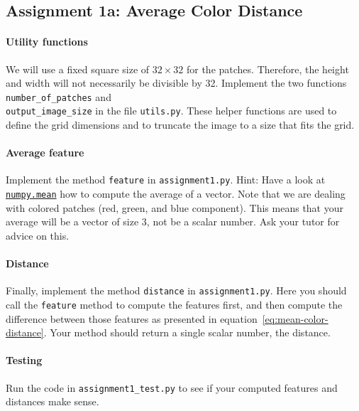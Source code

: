 \documentclass[]{article}
\begin{document}
	\subsection{Assignment 1a: Average Color Distance}
		\paragraph{Utility functions} 
		We will use a fixed square size of $32 \times 32$ for the patches.
		Therefore, the height and width will not necessarily be divisible by 32.
		Implement the two functions \verb|number_of_patches| and \\ 
		\verb|output_image_size| in the file \verb|utils.py|.
		These helper functions are used to define the grid dimensions and to truncate the image to a size that fits the grid.
		
		\paragraph{Average feature}
		Implement the method \verb|feature| in \verb|assignment1.py|. 
		Hint: Have a look at 
		\href{https://docs.scipy.org/doc/numpy/reference/generated/numpy.mean.html}{\texttt{numpy.mean}} how to compute the average of a vector.
		Note that we are dealing with colored patches (red, green, and blue component). 
		This means that your average will be a vector of size 3, not be a scalar number.
		Ask your tutor for advice on this.
		
		\paragraph{Distance}
		Finally, implement the method \verb|distance| in \verb|assignment1.py|.
		Here you should call the \verb|feature| method to compute the features first, and then compute the difference between those features as presented in equation~\ref{eq:mean-color-distance}.
		Your method should return a single scalar number, the distance.
		
		\paragraph{Testing}
		Run the code in \verb|assignment1_test.py| to see if your computed features and distances make sense.
		
\end{document}
